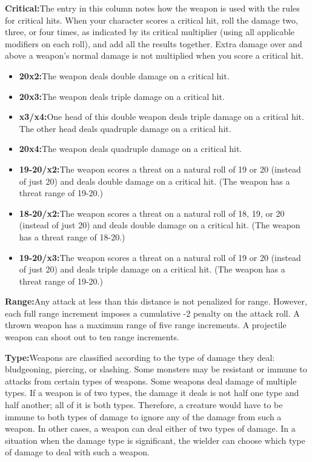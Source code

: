 \noindent\textbf{Critical:}{The entry in this column notes how the weapon is used with the rules for critical hits. When your character scores a critical hit, roll the damage two, three, or four times, as indicated by its critical multiplier (using all applicable modifiers on each roll), and add all the results together. Extra damage over and above a weapon’s normal damage is not multiplied when you score a critical hit.}

\begin{itemize}
  \item\noindent\textbf{20x2:}{The weapon deals double damage on a critical hit.}
  \item\noindent\textbf{20x3:}{The weapon deals triple damage on a critical hit.}
  \item\noindent\textbf{x3/x4:}{One head of this double weapon deals triple damage on a critical hit. The other head deals quadruple damage on a critical hit.}
  \item\noindent\textbf{20x4:}{The weapon deals quadruple damage on a critical hit.}
  \item\noindent\textbf{19-20/x2:}{The weapon scores a threat on a natural roll of 19 or 20 (instead of just 20) and deals double damage on a critical hit. (The weapon has a threat range of 19-20.)}
  \item\noindent\textbf{18-20/x2:}{The weapon scores a threat on a natural roll of 18, 19, or 20 (instead of just 20) and deals double damage on a critical hit. (The weapon has a threat range of 18-20.)}
  \item\noindent\textbf{19-20/x3:}{The weapon scores a threat on a natural roll of 19 or 20 (instead of just 20) and deals triple damage on a critical hit. (The weapon has a threat range of 19-20.)}
\end{itemize}

\noindent\textbf{Range:}{Any attack at less than this distance is not penalized for range. However, each full range increment imposes a cumulative -2 penalty on the attack roll. A thrown weapon has a maximum range of five range increments. A projectile weapon can shoot out to ten range increments.}

\noindent\textbf{Type:}{Weapons are classified according to the type of damage they deal: bludgeoning, piercing, or slashing. Some monsters may be resistant or immune to attacks from certain types of weapons. Some weapons deal damage of multiple types. If a weapon is of two types, the damage it deals is not half one type and half another; all of it is both types. Therefore, a creature would have to be immune to both types of damage to ignore any of the damage from such a weapon.  In other cases, a weapon can deal either of two types of damage. In a situation when the damage type is significant, the wielder can choose which type of damage to deal with such a weapon.}

